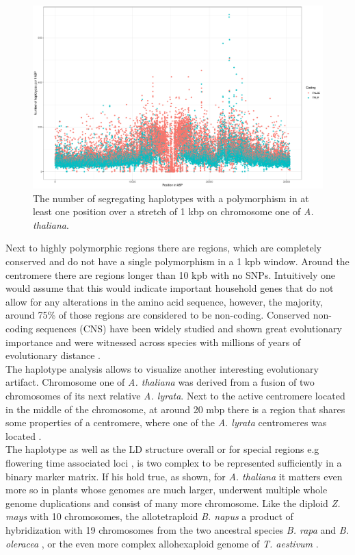 \begin{figure}[H]
\centering 
\includegraphics[height=.55\textheight, width=1.1\textwidth]{Figures/chr1_hap}
\decoRule
\caption[Haplotype strutcture of chromosome 1 of \textit{A. thaliana}]{The number of
  segregating haplotypes with a polymorphism in at least one position over a stretch of 1
  kbp on chromosome one of \textit{A. thaliana}.}
\label{fig:chr1}
\end{figure}

Next to highly polymorphic regions there are regions, which are completely conserved and
do not have a single polymorphism in a 1 kpb window. Around the centromere there are
regions longer than 10 kpb with no SNPs. Intuitively one would assume that this would
indicate important household genes that do not allow for any alterations in the amino acid
sequence, however, the majority, around 75\% of those regions are considered to be
non-coding. Conserved non-coding sequences (CNS) have been widely studied and shown great
evolutionary importance and were witnessed across species with millions of years of
evolutionary distance \cite{Burgess946}. \\
The haplotype analysis allows to visualize another interesting evolutionary
artifact. Chromosome one of \textit{A. thaliana} was derived from a fusion of two
chromosomes of its next relative \textit{A. lyrata}. Next to the active centromere located
in the middle of the chromosome, at around 20 mbp there is a region that shares some
properties of a centromere, where one of the \textit{A. lyrata} centromeres was
located \cite{koch2007evolution}. \\
The haplotype as well as the LD structure overall or for special regions e.g flowering
time associated loci \cite{li2014multiple}, is two complex to be represented sufficiently
in a binary marker matrix. If his hold true, as shown, for \textit{A. thaliana} it matters
even more so in plants whose genomes are much larger, underwent multiple whole genome
duplications and consist of many more chromosome. Like the diploid \textit{Z. mays} with
10 chromosomes, the allotetraploid \textit{B. napus} a product of hybridization with 19
chromosomes from the two ancestral species \textit{B. rapa} and \textit{B. oleracea}
\cite{liu2018brassica}, or the even more complex allohexaploid genome of
\textit{T. aestivum} \cite{international2018shifting}.

